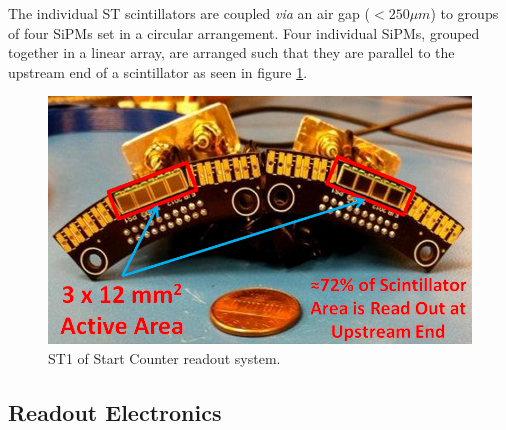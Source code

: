 The individual ST scintillators are coupled \emph{via} an air gap ($< 250 \mu m$) to groups of four SiPMs set in a circular arrangement.  Four individual SiPMs, grouped together in a linear array, are arranged such that they are parallel to the upstream end of a scintillator as seen in figure \ref{fig:Labeled ST1}.
\begin{figure}[!htb]
	\centering
	\includegraphics[width=1.0\columnwidth]{design/figs/Labeled_ST1_Penny}
	\caption[ST1 of Start Counter readout system]{ST1 of Start Counter readout system.}
	\label{fig:Labeled ST1}
\end{figure}  

\subsection{Readout Electronics}

